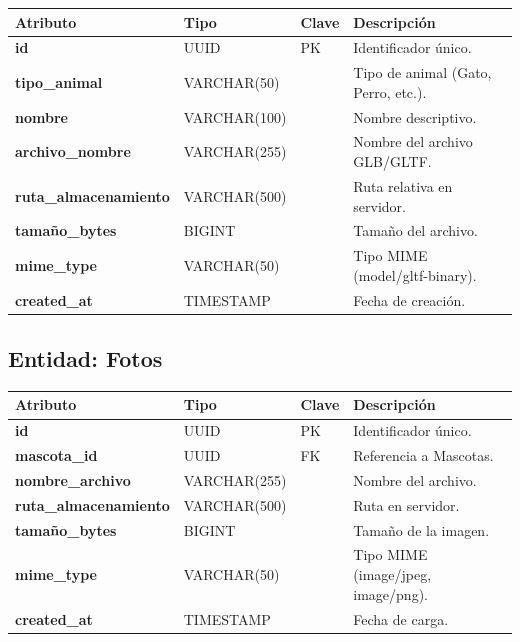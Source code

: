 \documentclass[12pt,a4paper]{article}
\begin{document}
\begin{table}[htbp]
\centering
\renewcommand{\arraystretch}{1.1}
\begin{tabularx}{\textwidth}{>{\bfseries}p{2.5cm} p{1.5cm} p{1.5cm} X}
\toprule
Atributo & Tipo & Clave & Descripci\'on \\
\midrule
id & UUID & PK & Identificador \'unico. \\
tipo\_animal & VARCHAR(50) & & Tipo de animal (Gato, Perro, etc.). \\
nombre & VARCHAR(100) & & Nombre descriptivo. \\
archivo\_nombre & VARCHAR(255) & & Nombre del archivo GLB/GLTF. \\
ruta\_almacenamiento & VARCHAR(500) & & Ruta relativa en servidor. \\
tama\~no\_bytes & BIGINT & & Tama\~no del archivo. \\
mime\_type & VARCHAR(50) & & Tipo MIME (model/gltf-binary). \\
created\_at & TIMESTAMP & & Fecha de creaci\'on. \\
\bottomrule
\end{tabularx}
\end{table}

\subsection{Entidad: Fotos}

\begin{table}[htbp]
\centering
\renewcommand{\arraystretch}{1.1}
\begin{tabularx}{\textwidth}{>{\bfseries}p{2.5cm} p{1.5cm} p{1.5cm} X}
\toprule
Atributo & Tipo & Clave & Descripci\'on \\
\midrule
id & UUID & PK & Identificador \'unico. \\
mascota\_id & UUID & FK & Referencia a Mascotas. \\
nombre\_archivo & VARCHAR(255) & & Nombre del archivo. \\
ruta\_almacenamiento & VARCHAR(500) & & Ruta en servidor. \\
tama\~no\_bytes & BIGINT & & Tama\~no de la imagen. \\
mime\_type & VARCHAR(50) & & Tipo MIME (image/jpeg, image/png). \\
created\_at & TIMESTAMP & & Fecha de carga. \\
\bottomrule
\end{tabularx}
\end{table}
\end{document}

